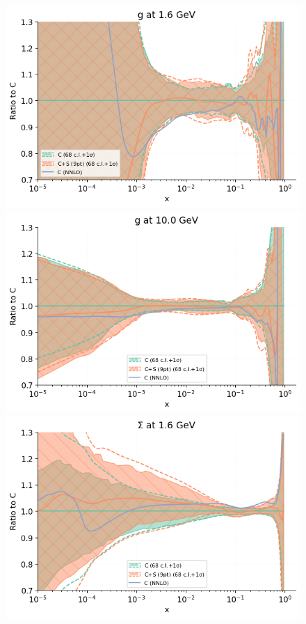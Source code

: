 \begin{figure}[H]
  \begin{center}
       \includegraphics[scale=0.45]{mhous/plots/jplots/pdfscalespecs0_basespecs0_pdfnormalize0_plot_pdfs_g.png}
    \includegraphics[scale=0.45]{mhous/plots/jplots/pdfscalespecs0_basespecs0_pdfnormalize0_plot_pdfs_g2.png}
         \includegraphics[scale=0.45]{mhous/plots/jplots/pdfscalespecs0_basespecs1_pdfnormalize0_plot_pdfs_Sigma.png}

\end{center}
\end{figure}

